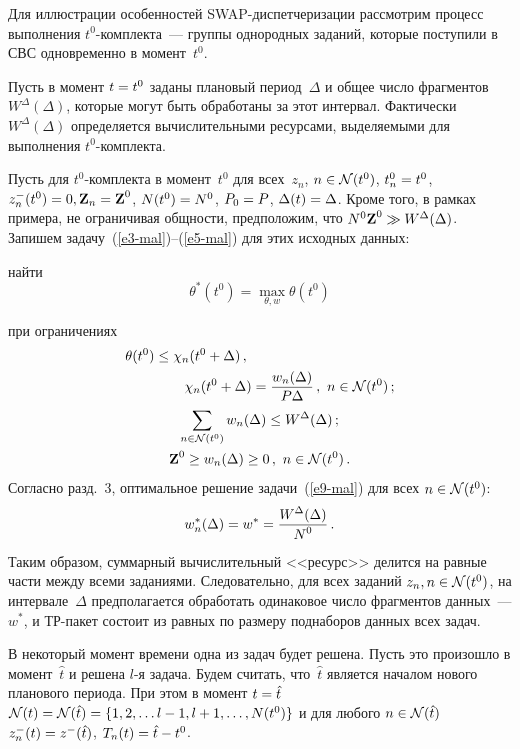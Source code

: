 \begin{multicols}{2}
Для иллюстрации особенностей SWAP-дис\-пет\-че\-ри\-за\-ции рассмотрим процесс
выполнения $t^0$-ком\-плек\-та~---  группы  однородных заданий, которые
поступили в СВС одновременно в момент~$t^0$.

Пусть  в момент  $t \hm= t^0$ заданы плановый период~$\Delta$ и общее
число фрагментов  $W^\Delta(\Delta)$, которые могут быть обработаны
за этот интервал.  Фактически    $W^\Delta(\Delta)$ определяется
вычислительными ресурсами, выделяемыми для выполнения
$t^0$-ком\-плекта.

Пусть  для $t^0$-комплекта в момент~$t^0$ для всех~$z_n$, $n\hm \in
\mathcal{N}(t^0)$, $ t_n^0 \hm= t^0$, $z_n^-(t^0) \hm= 0, \textbf{Z}_n \hm=
\textbf{Z}^0$, $N(t^0)\hm = N^0$, $P_0 \hm= P$, $\Delta(t) \hm= \Delta$. Кроме
того, в рамках примера, не ограничивая общности, предположим, что
$N^0 \textbf{Z}^0\hm \gg W^{\Delta} (\Delta )$. Запишем задачу~(\ref{e3-mal})--(\ref{e5-mal})
для этих исходных данных:

найти
\begin{equation}
 \theta^*(t^0) = \max\limits_{\theta, w} \theta(t^0)
 \label{e9-mal}
 \end{equation}

при ограничениях
\begin{gather*}
  \hspace*{-20pt}\theta(t^0)  \le \chi_n(t^0 + \Delta)\,,\hspace*{30mm} \\
\hspace*{15mm}\chi_n(t^0 + \Delta) = \fr{\displaystyle  w_{n}(\Delta)}{\displaystyle P \Delta}\,, \ 
n \in \mathcal{N}(t^0)\,;\\
 \sum\limits_{n \in \mathcal{N}(t^0)} w_n(\Delta ) \le  W^{\Delta} (\Delta )\,; \\
 \textbf{Z}^0 \ge w_n(\Delta ) \ge 0\,,\  n \in \mathcal{N}(t^0)\,.
 \end{gather*}
Согласно разд.~3, оптимальное решение задачи~(\ref{e9-mal}) для всех $n \hm\in
\mathcal{N}(t^0)$:
$$
w^*_n(\Delta ) = w^* = \displaystyle\frac{\displaystyle  W^{\Delta} (\Delta ) \mathstrut}{\displaystyle  N^0\mathstrut}\,.
$$
Таким образом, суммарный вычислительный <<ресурс>> делится на равные
части между всеми заданиями. Следовательно, для всех заданий $z_n, n
\hm\in \mathcal{N}(t^0)$, на интервале~$ \Delta$ предполагается обработать
одинаковое число фрагментов данных~--- $ w^*$, и ТР-па\-кет состоит из
равных  по размеру поднаборов данных всех задач.

В некоторый момент времени одна из задач будет решена. Пусть это
произошло в момент~$\hat t$ и решена $l$-я задача. Будем считать,
что~$\hat t$ является началом нового планового периода. При этом в
момент $t \hm= \hat t$  $ \mathcal{N}(t)\hm = 
\mathcal{N}(\hat t)\hm = \{1, 2, \ldots l \hm- 1,
l+1, \ldots , N(t^0)\}$ и  для любого $n\hm \in \mathcal{N}(\hat t)$ 
$z^-_n(t) \hm= z^-(\hat t)$, $T_n(t ) \hm=  \hat t \hm- t^0$.


\end{multicols}
